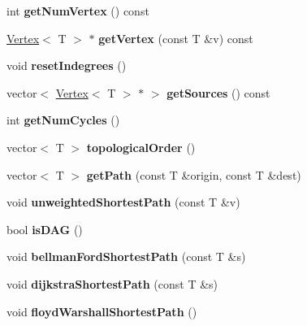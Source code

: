 \begin{DoxyCompactItemize}
int {\bfseries get\+Num\+Vertex} () const
\item 
\mbox{\label{class_graph_a67453d232f04e85c642b51554df1bc6a}} 
\hyperlink{class_vertex}{Vertex}$<$ T $>$ $\ast$ {\bfseries get\+Vertex} (const T \&v) const
\item 
\mbox{\label{class_graph_af34eb86d804272e6e3e221a9ed688c53}} 
void {\bfseries reset\+Indegrees} ()
\item 
\mbox{\label{class_graph_a947115150a94f88ac9aedbcec59dd07e}} 
vector$<$ \hyperlink{class_vertex}{Vertex}$<$ T $>$ $\ast$ $>$ {\bfseries get\+Sources} () const
\item 
\mbox{\label{class_graph_a694dff81073c38b669057f0c6bd4cbb1}} 
int {\bfseries get\+Num\+Cycles} ()
\item 
\mbox{\label{class_graph_a2e75512c089c3916dda9cf61e1185d9d}} 
vector$<$ T $>$ {\bfseries topological\+Order} ()
\item 
\mbox{\label{class_graph_ab4054ca572c10669dd3e05d6d41c116c}} 
vector$<$ T $>$ {\bfseries get\+Path} (const T \&origin, const T \&dest)
\item 
\mbox{\label{class_graph_ae5264597aacaf4f45819e96a6d6c89aa}} 
void {\bfseries unweighted\+Shortest\+Path} (const T \&v)
\item 
\mbox{\label{class_graph_ab49d07c2bd6b8b30d5ae82bc558b821a}} 
bool {\bfseries is\+D\+AG} ()
\item 
\mbox{\label{class_graph_a1d6769b79beaa76f78fd9c9209833bef}} 
void {\bfseries bellman\+Ford\+Shortest\+Path} (const T \&s)
\item 
\mbox{\label{class_graph_a445a38cf4045797198eae2b818b602de}} 
void {\bfseries dijkstra\+Shortest\+Path} (const T \&s)
\item 
\mbox{\label{class_graph_ae5161f4408bf1ead2b29d19d67fb04ee}} 
void {\bfseries floyd\+Warshall\+Shortest\+Path} ()
\item 
\mbox{\label{class_graph_a7e137f1ef838395ac1044a944fa54448}} 

\end{DoxyCompactItemize}
